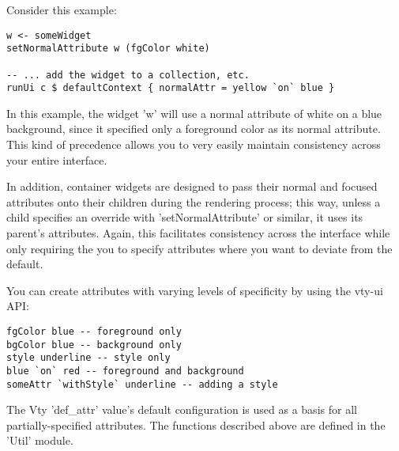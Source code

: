 \documentclass[11pt, letterpaper, oneside, titlepage]{article}
\begin{document}
Consider this example:

\begin{verbatim}
w <- someWidget
setNormalAttribute w (fgColor white)

-- ... add the widget to a collection, etc.
runUi c $ defaultContext { normalAttr = yellow `on` blue }
\end{verbatim}

In this example, the widget 'w' will use a normal attribute of white on
a blue background, since it specified only a foreground color as its
normal attribute.  This kind of precedence allows you to very easily
maintain consistency across your entire interface.

In addition, container widgets are designed to pass their normal and
focused attributes onto their children during the rendering process;
this way, unless a child specifies an override with 'setNormalAttribute'
or similar, it uses its parent's attributes.  Again, this facilitates
consistency across the interface while only requiring the you to specify
attributes where you want to deviate from the default.

You can create attributes with varying levels of specificity by using
the vty-ui API:

\begin{verbatim}
fgColor blue -- foreground only
bgColor blue -- background only
style underline -- style only
blue `on` red -- foreground and background
someAttr `withStyle` underline -- adding a style
\end{verbatim}

The Vty 'def\_attr' value's default configuration is used as a basis for
all partially-specified attributes.  The functions described above are
defined in the 'Util' module.
\end{document}
